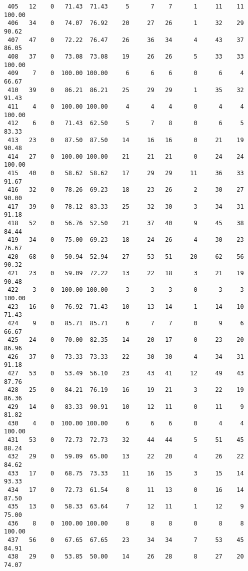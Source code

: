 \begin{verbatim}
 405   12    0   71.43  71.43     5      7    7      1     11    11   100.00
 406   34    0   74.07  76.92    20     27   26      1     32    29    90.62
 407   47    0   72.22  76.47    26     36   34      4     43    37    86.05
 408   37    0   73.08  73.08    19     26   26      5     33    33   100.00
 409    7    0  100.00 100.00     6      6    6      0      6     4    66.67
 410   39    0   86.21  86.21    25     29   29      1     35    32    91.43
 411    4    0  100.00 100.00     4      4    4      0      4     4   100.00
 412    6    0   71.43  62.50     5      7    8      0      6     5    83.33
 413   23    0   87.50  87.50    14     16   16      0     21    19    90.48
 414   27    0  100.00 100.00    21     21   21      0     24    24   100.00
 415   40    0   58.62  58.62    17     29   29     11     36    33    91.67
 416   32    0   78.26  69.23    18     23   26      2     30    27    90.00
 417   39    0   78.12  83.33    25     32   30      3     34    31    91.18
 418   52    0   56.76  52.50    21     37   40      9     45    38    84.44
 419   34    0   75.00  69.23    18     24   26      4     30    23    76.67
 420   68    0   50.94  52.94    27     53   51     20     62    56    90.32
 421   23    0   59.09  72.22    13     22   18      3     21    19    90.48
 422    3    0  100.00 100.00     3      3    3      0      3     3   100.00
 423   16    0   76.92  71.43    10     13   14      1     14    10    71.43
 424    9    0   85.71  85.71     6      7    7      0      9     6    66.67
 425   24    0   70.00  82.35    14     20   17      0     23    20    86.96
 426   37    0   73.33  73.33    22     30   30      4     34    31    91.18
 427   53    0   53.49  56.10    23     43   41     12     49    43    87.76
 428   25    0   84.21  76.19    16     19   21      3     22    19    86.36
 429   14    0   83.33  90.91    10     12   11      0     11     9    81.82
 430    4    0  100.00 100.00     6      6    6      0      4     4   100.00
 431   53    0   72.73  72.73    32     44   44      5     51    45    88.24
 432   29    0   59.09  65.00    13     22   20      4     26    22    84.62
 433   17    0   68.75  73.33    11     16   15      3     15    14    93.33
 434   17    0   72.73  61.54     8     11   13      0     16    14    87.50
 435   13    0   58.33  63.64     7     12   11      1     12     9    75.00
 436    8    0  100.00 100.00     8      8    8      0      8     8   100.00
 437   56    0   67.65  67.65    23     34   34      7     53    45    84.91
 438   29    0   53.85  50.00    14     26   28      8     27    20    74.07

\end{verbatim}
